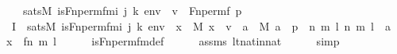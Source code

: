 \begin{isabellebody}
\ \ \ {\isachardoublequoteopen}sats{\isacharparenleft}{\kern0pt}M{\isacharcomma}{\kern0pt}\ is{\isacharunderscore}{\kern0pt}Fn{\isacharunderscore}{\kern0pt}perm{\isacharunderscore}{\kern0pt}fm{\isacharparenleft}{\kern0pt}i{\isacharcomma}{\kern0pt}\ j{\isacharcomma}{\kern0pt}\ k{\isacharparenright}{\kern0pt}{\isacharcomma}{\kern0pt}\ env{\isacharparenright}{\kern0pt}\ {\isasymlongleftrightarrow}\ v\ {\isacharequal}{\kern0pt}\ Fn{\isacharunderscore}{\kern0pt}perm{\isacharparenleft}{\kern0pt}f{\isacharcomma}{\kern0pt}\ p{\isacharparenright}{\kern0pt}{\isachardoublequoteclose}\isanewline
%
\isadelimproof
%
\endisadelimproof
%
\isatagproof
{}\isamarkupfalse%
\ {\isacharminus}{\kern0pt}\ \isanewline
\ \ \isamarkupfalse%
\ I{}{\isacharcolon}{\kern0pt}\ \ {\isachardoublequoteopen}sats{\isacharparenleft}{\kern0pt}M{\isacharcomma}{\kern0pt}\ is{\isacharunderscore}{\kern0pt}Fn{\isacharunderscore}{\kern0pt}perm{\isacharunderscore}{\kern0pt}fm{\isacharparenleft}{\kern0pt}i{\isacharcomma}{\kern0pt}\ j{\isacharcomma}{\kern0pt}\ k{\isacharparenright}{\kern0pt}{\isacharcomma}{\kern0pt}\ env{\isacharparenright}{\kern0pt}\ {\isasymlongleftrightarrow}\ {\isacharparenleft}{\kern0pt}{\isasymforall}x\ {\isasymin}\ M{\isachardot}{\kern0pt}\ {\isacharparenleft}{\kern0pt}x\ {\isasymin}\ v\ {\isasymlongleftrightarrow}\ {\isacharparenleft}{\kern0pt}{\isasymexists}a\ {\isasymin}\ M{\isachardot}{\kern0pt}\ a\ {\isasymin}\ p\ {\isasymand}\ {\isacharparenleft}{\kern0pt}{\isasymexists}n\ m\ l{\isachardot}{\kern0pt}\ {\isacharless}{\kern0pt}{\isacharless}{\kern0pt}n{\isacharcomma}{\kern0pt}\ m{\isachargreater}{\kern0pt}{\isacharcomma}{\kern0pt}\ l{\isachargreater}{\kern0pt}\ {\isacharequal}{\kern0pt}\ a\ {\isasymand}\ x\ {\isacharequal}{\kern0pt}\ {\isacharless}{\kern0pt}{\isacharless}{\kern0pt}f{\isacharbackquote}{\kern0pt}n{\isacharcomma}{\kern0pt}\ m{\isachargreater}{\kern0pt}{\isacharcomma}{\kern0pt}\ l{\isachargreater}{\kern0pt}{\isacharparenright}{\kern0pt}{\isacharparenright}{\kern0pt}{\isacharparenright}{\kern0pt}{\isacharparenright}{\kern0pt}{\isachardoublequoteclose}\isanewline
\ \ \ \ \isamarkupfalse%
\ is{\isacharunderscore}{\kern0pt}Fn{\isacharunderscore}{\kern0pt}perm{\isacharunderscore}{\kern0pt}fm{\isacharunderscore}{\kern0pt}def\isanewline
\ \ \ \ \isamarkupfalse%
\ assms\ lt{\isacharunderscore}{\kern0pt}nat{\isacharunderscore}{\kern0pt}in{\isacharunderscore}{\kern0pt}nat\isanewline
\ \ \ \ \isamarkupfalse%
\ simp\isanewline
\ \ \ \ \isamarkupfalse%

\end{isabellebody}
